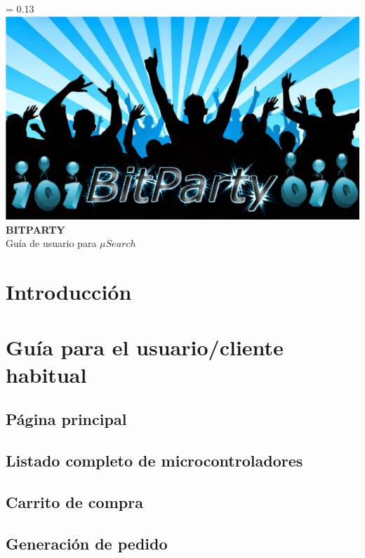 \documentclass[11pt,spanish]{article}
\renewcommand{\thepage}{\roman{page}}
\newcommand{\nombreDelProyecto}{$\mu Search$}
\newcommand{\singlelinebreak}{\\[\baselineskip]}
\newcommand{\multiplelinebreak}[1]{\\[#1\baselineskip]}
\newlength{\drop}
\newcommand*{\titulo}{\begingroup
\thispagestyle{empty}
\drop = 0.13\textheight
\centering
\vfill
\vspace*{\drop}
\includegraphics[scale=0.25]{img/bitparty_big}\singlelinebreak
{\Huge\bf BITPARTY}\multiplelinebreak{2}
{\huge Guía de usuario para \nombreDelProyecto}\multiplelinebreak{2}
\vfill
\vspace*{\drop}
\endgroup}
\begin{document}
\titulo
\clearpage

\newpage


\tableofcontents
\clearpage


\renewcommand{\thepage}{\arabic{page}}

\section{Introducción}


\newpage
\section{Guía para el usuario/cliente habitual}


\subsection{Página principal}


\subsection{Listado completo de microcontroladores}


\subsection{Carrito de compra}


\subsection{Generación de pedido}

\end{document}
